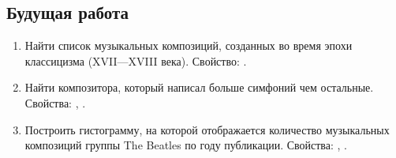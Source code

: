 \subsection{Будущая работа}
\begin{enumerate}
\item Найти список музыкальных композиций, созданных во время эпохи классицизма (XVII—XVIII века).
Свойство: .
\item Найти композитора, который написал больше симфоний чем остальные.
Свойства: , .
\item Построить гистограмму, на которой отображается количество музыкальных композиций группы The Beatles по году публикации.
Свойства: , .
\end{enumerate}
